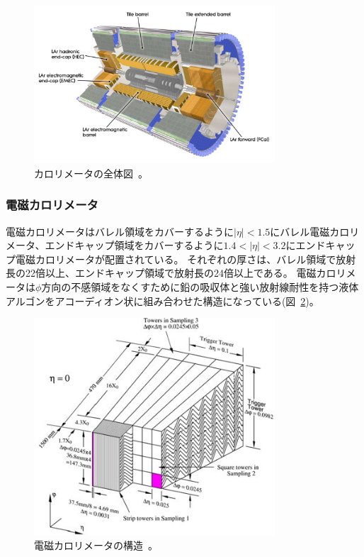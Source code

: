 \begin{figure}[h]
  \centering
  \includegraphics[clip, width=9cm]{fig/2/Calorimeter_d3.pdf}
  \caption{カロリメータの全体図~\cite{Aad:1129811}。}
  \label{fig:2-10}
\end{figure}

\subsubsection{電磁カロリメータ}
電磁カロリメータはバレル領域をカバーするように$|\eta|<1.5$にバレル電磁カロリメータ、エンドキャップ領域をカバーするように$1.4<|\eta|<3.2$にエンドキャップ電磁カロリメータが配置されている。
それぞれの厚さは、バレル領域で放射長の22倍以上、エンドキャップ領域で放射長の24倍以上である。
電磁カロリメータは$\phi$方向の不感領域をなくすために鉛の吸収体と強い放射線耐性を持つ液体アルゴンをアコーディオン状に組み合わせた構造になっている(図~\ref{fig:2-11})。


\begin{figure}[h]
  \centering
  \includegraphics[clip, width=9cm]{fig/2/electoricCal.jpg}
  \caption{電磁カロリメータの構造~\cite{Aad:1129811}。}
  \label{fig:2-11}
\end{figure}

